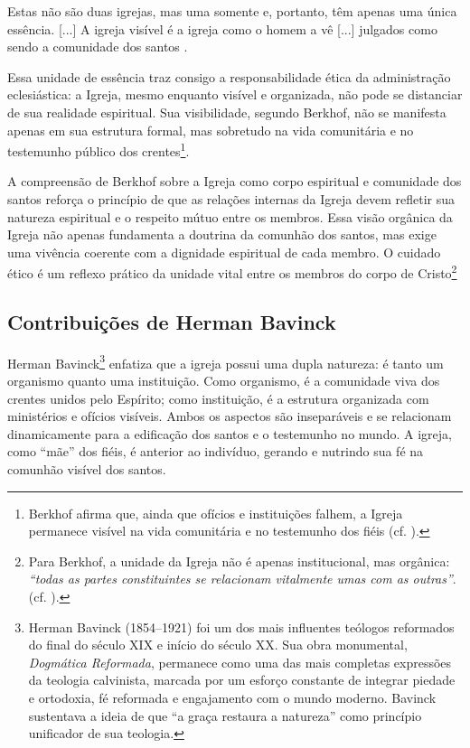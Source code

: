 \begin{citacao}
    Estas não são duas igrejas, mas uma somente e, portanto, têm apenas uma única essência. [...] A igreja visível é a igreja como o homem a vê [...] julgados como sendo a comunidade dos santos \cite[p.~642]{berkhof2012}.
\end{citacao}

Essa unidade de essência traz consigo a responsabilidade ética da administração eclesiástica: a Igreja, mesmo enquanto visível e organizada, não pode se distanciar de sua realidade espiritual. Sua visibilidade, segundo Berkhof, não se manifesta apenas em sua estrutura formal, mas sobretudo na vida comunitária e no testemunho público dos crentes\footnote{Berkhof afirma que, ainda que ofícios e instituições falhem, a Igreja permanece visível na vida comunitária e no testemunho dos fiéis (cf. \cite[p.~645]{berkhof2012}).}.

A compreensão de Berkhof sobre a Igreja como corpo espiritual e comunidade dos santos reforça o princípio de que as relações internas da Igreja devem refletir sua natureza espiritual e o respeito mútuo entre os membros. Essa visão orgânica da Igreja não apenas fundamenta a doutrina da comunhão dos santos, mas exige uma vivência coerente com a dignidade espiritual de cada membro. O cuidado ético é um reflexo prático da unidade vital entre os membros do corpo de Cristo\footnote{Para Berkhof, a unidade da Igreja não é apenas institucional, mas orgânica: \textit{``todas as partes constituintes se relacionam vitalmente umas com as outras''}. (cf. \cite[p.~646]{berkhof2012}).}

\subsection{Contribuições de Herman Bavinck}

Herman Bavinck\footnote{Herman Bavinck (1854–1921) foi um dos mais influentes teólogos reformados do final do século XIX e início do século XX. Sua obra monumental, \textit{Dogmática Reformada}, permanece como uma das mais completas expressões da teologia calvinista, marcada por um esforço constante de integrar piedade e ortodoxia, fé reformada e engajamento com o mundo moderno. Bavinck sustentava a ideia de que ``a graça restaura a natureza'' como princípio unificador de sua teologia.} enfatiza que a igreja possui uma dupla natureza: é tanto um organismo quanto uma instituição. Como organismo, é a comunidade viva dos crentes unidos pelo Espírito; como instituição, é a estrutura organizada com ministérios e ofícios visíveis. Ambos os aspectos são inseparáveis e se relacionam dinamicamente para a edificação dos santos e o testemunho no mundo. A igreja, como ``mãe'' dos fiéis, é anterior ao indivíduo, gerando e nutrindo sua fé na comunhão visível dos santos. \cite[p.~336]{bavinck2012}

